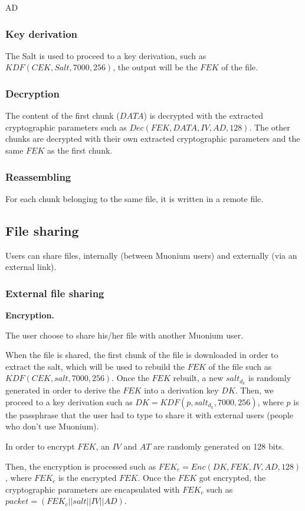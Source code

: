 AD\documentclass[a4paper,10pt]{article}
\begin{document}
\subsubsection{Key derivation}
The Salt is used to proceed to a key derivation, such as $KDF(CEK, Salt, 7000, 256)$, the output will be the $FEK$ of the file.

\subsubsection{Decryption}
The content of the first chunk ($DATA$) is decrypted with the extracted cryptographic parameters such as $Dec(FEK,DATA,IV,AD,128)$. The other chunks are decrypted with their own extracted cryptographic parameters and the same $FEK$ as the first chunk.

\subsubsection{Reassembling}
For each chunk belonging to the same file, it is written in a remote file.
\medskip

\subsection{File sharing}
Users can share files, internally (between Muonium users) and externally (via an external link).

\subsubsection{External file sharing}

\textbf{Encryption.}

The user choose to share his/her file with another Muonium user.

When the file is shared, the first chunk of the file is downloaded in order to extract the salt, which will
be used to rebuild the $FEK$ of the file such as $KDF(CEK, salt, 7000, 256)$. Once the $FEK$ rebuilt,
a new $salt_d_k$ is randomly generated in order to derive the $FEK$ into a derivation key $DK$. Then,
we proceed to a key derivation such as $DK=KDF(p, salt_d_k, 7000, 256)$, where $p$ is the passphrase
that the user had to type to share it with external users (people who don't use Muonium).

In order to encrypt $FEK$, an $IV$ and $AT$ are randomly generated on 128 bits.

Then, the encryption is processed such as $FEK_c=Enc(DK, FEK, IV, AD, 128)$, where $FEK_c$ is the
encrypted $FEK$. Once the $FEK$ got encrypted, the cryptographic parameters are encapsulated with
$FEK_c$ such as $packet=(FEK_c||salt||IV||AD)$.
\end{document}

